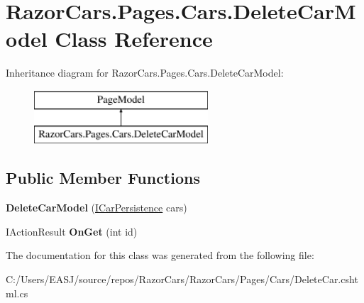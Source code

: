 \hypertarget{class_razor_cars_1_1_pages_1_1_cars_1_1_delete_car_model}{}\section{Razor\+Cars.\+Pages.\+Cars.\+Delete\+Car\+Model Class Reference}
\label{class_razor_cars_1_1_pages_1_1_cars_1_1_delete_car_model}
Inheritance diagram for Razor\+Cars.\+Pages.\+Cars.\+Delete\+Car\+Model\+:\begin{figure}[H]
\begin{center}
\leavevmode
\includegraphics[height=2.000000cm]{class_razor_cars_1_1_pages_1_1_cars_1_1_delete_car_model}
\end{center}
\end{figure}
\subsection*{Public Member Functions}
\begin{DoxyCompactItemize}
\item 
\mbox{\label{class_razor_cars_1_1_pages_1_1_cars_1_1_delete_car_model_a256d5f8a07b33336c42f1349eb5c0465}} 
{\bfseries Delete\+Car\+Model} (\mbox{\hyperlink{interface_razor_cars_1_1services_1_1_i_car_persistence}{I\+Car\+Persistence}} cars)
\item 
\mbox{\label{class_razor_cars_1_1_pages_1_1_cars_1_1_delete_car_model_a7a68dbfc6ed5d452e721c95b1059f046}} 
I\+Action\+Result {\bfseries On\+Get} (int id)
\end{DoxyCompactItemize}


The documentation for this class was generated from the following file\+:\begin{DoxyCompactItemize}
\item 
C\+:/\+Users/\+E\+A\+S\+J/source/repos/\+Razor\+Cars/\+Razor\+Cars/\+Pages/\+Cars/Delete\+Car.\+cshtml.\+cs\end{DoxyCompactItemize}
